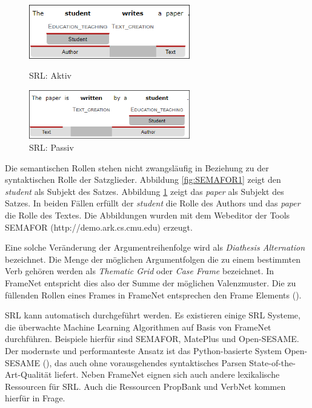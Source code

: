 \begin{figure}
\includegraphics[width=7cm]{pictures/SEMAFOR1.png}
\caption{SRL: Aktiv}
\label{fig:SEMAFOR1}
\includegraphics[width=7cm]{pictures/SEMAFOR2.png}
\caption{SRL: Passiv}
\label{fig:SEMAFOR2}
\end{figure}

Die semantischen Rollen stehen nicht zwangsläufig in Beziehung zu der syntaktischen Rolle der Satzglieder. Abbildung  \ref{fig:SEMAFOR1} zeigt den \textit{student} als Subjekt des Satzes. Abbildung \ref{fig:SEMAFOR2} zeigt das \textit{paper} als Subjekt des Satzes.
In beiden Fällen erfüllt der \textit{student} die Rolle des Authors und das \textit{paper} die Rolle des Textes. Die Abbildungen wurden mit dem Webeditor der Tools SEMAFOR (http://\-demo\-.ark\-.cs\-.cmu\-.edu) erzeugt.
\par
Eine solche Veränderung der Argumentreihenfolge wird als \textit{Diathesis Alternation} bezeichnet. Die Menge der möglichen Argumentfolgen die zu einem bestimmten Verb gehören werden als \textit{Thematic Grid} oder \textit{Case Frame} bezeichnet. In FrameNet entspricht dies also der Summe der möglichen Valenzmuster. Die zu füllenden Rollen eines Frames in FrameNet entsprechen den Frame Elements (\cite[vgl.][383]{JURAFSKY}).
\par
\ac{SRL} kann automatisch durchgeführt werden. Es existieren einige \ac{SRL} Systeme, die überwachte Machine Learning Algorithmen auf Basis von FrameNet durchführen. Beispiele hierfür sind SEMAFOR, MatePlus und Open-SESAME. Der modernste und performanteste Ansatz ist das Python-basierte System Open-SESAME (\cite[vgl.][8]{SWAYAMDIPTA}), das auch ohne vorausgehendes syntaktisches Parsen State-of-the-Art-Qualität liefert.
Neben FrameNet eignen sich auch andere lexikalische Ressourcen für \ac{SRL}. Auch die Ressourcen PropBank und VerbNet kommen hierfür in Frage.
